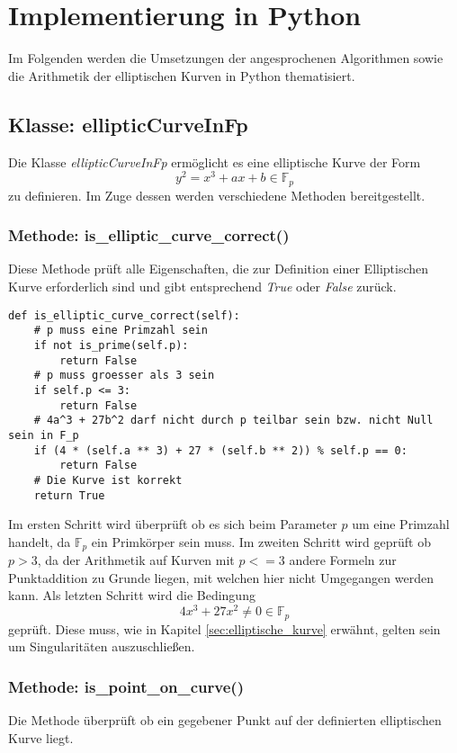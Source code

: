 \chapter{Implementierung in Python}
Im Folgenden werden die Umsetzungen der angesprochenen Algorithmen sowie die Arithmetik der elliptischen Kurven in Python thematisiert.

\section{Klasse: ellipticCurveInFp}
Die Klasse \textit{ellipticCurveInFp} ermöglicht es eine elliptische Kurve der Form $$y^2 = x^3 + ax + b \in \mathbb{F}_p$$ zu definieren. Im Zuge dessen werden verschiedene Methoden bereitgestellt.
\subsection{Methode: is\_elliptic\_curve\_correct()}
Diese Methode prüft alle Eigenschaften, die zur Definition einer Elliptischen Kurve erforderlich sind und gibt entsprechend \textit{True} oder \textit{False} zurück.

\vspace{\baselineskip}
\begin{lstlisting}[caption={Methode: is\_elliptic\_curve\_correct()}, captionpos=b]
def is_elliptic_curve_correct(self):
	# p muss eine Primzahl sein
	if not is_prime(self.p):
		return False
	# p muss groesser als 3 sein
    if self.p <= 3:
        return False
	# 4a^3 + 27b^2 darf nicht durch p teilbar sein bzw. nicht Null sein in F_p
	if (4 * (self.a ** 3) + 27 * (self.b ** 2)) % self.p == 0:
		return False
	# Die Kurve ist korrekt
    return True
\end{lstlisting}
\vspace{\baselineskip}
Im ersten Schritt wird überprüft ob es sich beim Parameter $p$ um eine Primzahl handelt, da $\mathbb{F}_p$ ein Primkörper sein muss. Im zweiten Schritt wird geprüft ob $p > 3$, da der Arithmetik auf Kurven mit $p <= 3$ andere Formeln zur Punktaddition zu Grunde liegen, mit welchen hier nicht Umgegangen werden kann. Als letzten Schritt wird die Bedingung $$4x^3 + 27x^2 \neq 0 \in \mathbb{F}_p$$ geprüft. Diese muss, wie in Kapitel \ref{sec:elliptische_kurve} erwähnt, gelten sein um Singularitäten auszuschließen.

\subsection{Methode: is\_point\_on\_curve()}
Die Methode überprüft ob ein gegebener Punkt auf der definierten elliptischen Kurve liegt.

